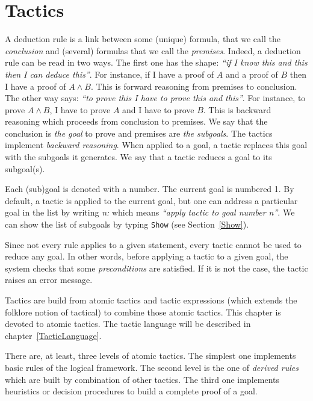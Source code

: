 \chapter{Tactics
\label{Tactics}}

A deduction rule is a link between some (unique) formula, that we call
the {\em conclusion} and (several) formulas that we call the {\em
premises}. Indeed, a deduction rule can be read in two ways. The first
one has the shape: {\it ``if I know this and this then I can deduce
this''}. For instance, if I have a proof of $A$ and a proof of $B$
then I have a proof of $A \land B$. This is forward reasoning from
premises to conclusion. The other way says: {\it ``to prove this I
have to prove this and this''}. For instance, to prove $A \land B$, I
have to prove $A$ and I have to prove $B$. This is backward reasoning
which proceeds from conclusion to premises. We say that the conclusion
is {\em the goal} to prove and premises are {\em the
subgoals}.  The tactics implement {\em backward
reasoning}. When applied to a goal, a tactic replaces this goal with
the subgoals it generates. We say that a tactic reduces a goal to its
subgoal(s).

Each (sub)goal is denoted with a number. The current goal is numbered
1. By default, a tactic is applied to the current goal, but one can
address a particular goal in the list by writing {\sl n:\tac} which
means {\it ``apply tactic {\tac} to goal number {\sl n}''}.
We can show the list of subgoals by typing {\tt Show} (see
Section~\ref{Show}). 

Since not every rule applies to a given statement, every tactic cannot be
used to reduce any goal. In other words, before applying a tactic to a
given goal, the system checks that some {\em preconditions} are
satisfied. If it is not the case, the tactic raises an error message.

Tactics are build from atomic tactics and tactic expressions (which
extends the folklore notion of tactical) to combine those atomic
tactics. This chapter is devoted to atomic tactics. The tactic
language will be described in chapter~\ref{TacticLanguage}.

There are, at least, three levels of atomic tactics. The simplest one
implements basic rules of the logical framework. The second level is
the one of {\em derived rules} which are built by combination of other
tactics. The third one implements heuristics or decision procedures to
build a complete proof of a goal.

